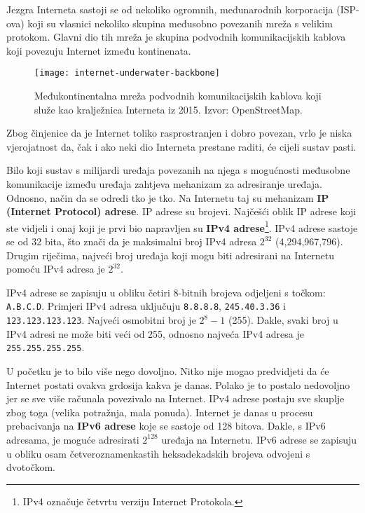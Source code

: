 Jezgra Interneta sastoji se od nekoliko ogromnih, međunarodnih korporacija (ISP-ova) koji su vlasnici nekoliko skupina međusobno povezanih mreža s velikim protokom.
Glavni dio tih mreža je skupina podvodnih komunikacijskih kablova koji povezuju Internet između kontinenata.
\begin{figure}[h]
    \texttt{[image: internet-underwater-backbone]}
    \caption{Međukontinentalna mreža podvodnih komunikacijskih kablova koji služe kao kralježnica Interneta iz 2015. Izvor: OpenStreetMap. }\label{fig:figure6}
\end{figure}
Zbog činjenice da je Internet toliko rasprostranjen i dobro povezan, vrlo je niska vjerojatnost da, čak i ako neki dio Interneta prestane raditi, će cijeli sustav pasti.


Bilo koji sustav s milijardi uređaja povezanih na njega s mogućnosti međusobne komunikacije između uređaja zahtjeva mehanizam za adresiranje uređaja.
Odnosno, način da se odredi tko je tko.
Na Internetu taj su mehanizam \textbf{IP (Internet Protocol) adrese}.
IP adrese su brojevi.
Najčešći oblik IP adrese koji ste vidjeli i onaj koji je prvi bio napravljen su \textbf{IPv4 adrese}\footnote{IPv4 označuje četvrtu verziju Internet Protokola.}.
IPv4 adrese sastoje se od 32 bita, što znači da je maksimalni broj IPv4 adresa $ 2^{32} $ (4,294,967,796).
Drugim riječima, najveći broj uređaja koji mogu biti adresirani na Internetu pomoću IPv4 adresa je $ 2^{32} $.

IPv4 adrese se zapisuju u obliku četiri 8-bitnih brojeva odjeljeni s točkom: \verb|A.B.C.D|.
Primjeri IPv4 adresa uključuju \verb|8.8.8.8|, \verb|245.40.3.36| i \verb|123.123.123.123|.
Najveći osmobitni broj je $ 2^8 - 1 $ (255).
Dakle, svaki broj u IPv4 adresi ne može biti veći od 255, odnosno najveća IPv4 adresa je \verb|255.255.255.255|.

U početku je to bilo više nego dovoljno.
Nitko nije mogao predvidjeti da će Internet postati ovakva grdosija kakva je danas.
Polako je to postalo nedovoljno jer se sve više računala povezivalo na Internet.
IPv4 adrese postaju sve skuplje zbog toga (velika potražnja, mala ponuda).
Internet je danas u procesu prebacivanja na \textbf{IPv6 adrese} koje se sastoje od 128 bitova.
Dakle, s IPv6 adresama, je moguće adresirati $ 2^{128} $ uređaja na Internetu.
IPv6 adrese se zapisuju u obliku osam četveroznamenkastih heksadekadskih brojeva odvojeni s dvotočkom.

